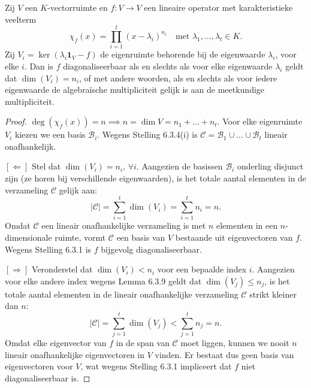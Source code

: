 \begin{stelling}[6.3.10]
    Zij $V$ een $K$-vectorruimte en $f \colon V \to V$ een lineaire operator met karakteristieke veelterm
    \[ \chi_f(x) = \prod_{i=1}^t (x - \lambda_i)^{n_i} \quad \text{met } \lambda_1, \dots, \lambda_t \in K. \]
    Zij $V_i = \operatorname{ker}(\lambda_i \mathbf{1}_V - f)$ de eigenruimte behorende bij de eigenwaarde $\lambda_i$, voor elke $i$. Dan is $f$ diagonaliseerbaar als en slechts als voor elke eigenwaarde $\lambda_i$ geldt dat $\dim(V_i) = n_i$, of met andere woorden, als en slechts als voor iedere eigenwaarde de algebraïsche multipliciteit gelijk is aan de meetkundige multipliciteit.
\end{stelling}
\begin{proof}
    $\operatorname{deg}(\chi_f(x))=n \implies n = \dim V = n_1 + \dots + n_t$.
    Voor elke eigenruimte $V_i$ kiezen we een basis $\mathcal{B}_i$.
    Wegens Stelling 6.3.4(i) is $\mathcal{C} = \mathcal{B}_1 \cup \dots \cup \mathcal{B}_t$ lineair onafhankelijk.

    \([\Leftarrow]\)
    Stel dat $\dim(V_i) = n_i, \, \forall i$.
     Aangezien de basissen $\mathcal{B}_i$ onderling disjunct zijn (ze horen bij verschillende eigenwaarden),
     is het totale aantal elementen in de verzameling $\mathcal{C}$ gelijk aan:
    \[ |\mathcal{C}| = \sum_{i=1}^t \dim(V_i) = \sum_{i=1}^t n_i = n . \]
    Omdat $\mathcal{C}$ een lineair onafhankelijke verzameling is met $n$ elementen in een $n$-dimensionale ruimte,
    vormt $\mathcal{C}$ een basis van $V$ bestaande uit eigenvectoren van $f$.
    Wegens Stelling 6.3.1 is $f$ bijgevolg diagonaliseerbaar.

    \([\Rightarrow]\) 
    Veronderstel dat $\dim(V_i) < n_i$ voor een bepaalde index $i$.
     Aangezien voor elke andere index wegens Lemma 6.3.9 geldt dat $\dim(V_j) \le n_j$,
    is het totale aantal elementen in de lineair onafhankelijke verzameling $\mathcal{C}$ strikt kleiner dan $n$:
    \[ |\mathcal{C}| = \sum_{j=1}^t \dim(V_j) < \sum_{j=1}^t n_j = n. \]
    Omdat elke eigenvector van $f$ in de span van $\mathcal{C}$ moet liggen,
    kunnen we nooit $n$ lineair onafhankelijke eigenvectoren in $V$ vinden.
    Er bestaat dus geen basis van eigenvectoren voor $V$, wat wegens Stelling 6.3.1 impliceert dat $f$ niet diagonaliseerbaar is.
\end{proof}